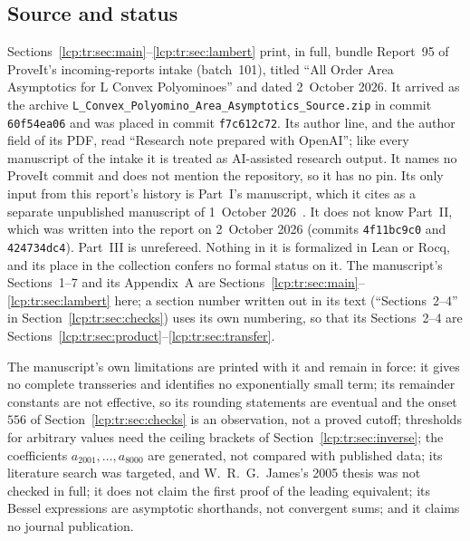 \documentclass[11pt]{article}
\numberwithin{equation}{section}
\theoremstyle{definition}\newtheorem{definition}[theorem]{Definition}
\theoremstyle{remark}\newtheorem{remark}[theorem]{Remark}
\begin{document}
\subsection{Source and status}\label{lcp:tr:sec:source}
Sections~\ref{lcp:tr:sec:main}--\ref{lcp:tr:sec:lambert} print, in full,
bundle Report~95 of ProveIt's incoming-reports intake (batch~101), titled
``All Order Area Asymptotics for L Convex Polyominoes'' and dated
2~October 2026. It arrived as the archive
\texttt{L\_\allowbreak Convex\_\allowbreak Polyomino\_\allowbreak Area\_\allowbreak Asymptotics\_\allowbreak Source.zip}
in commit \texttt{60f54ea06} and was placed in commit \texttt{f7c612c72}.
Its author line, and the author field of its PDF, read ``Research note
prepared with OpenAI''; like every manuscript of the intake it is treated
as AI-assisted research output. It names no ProveIt commit and does not
mention the repository, so it has no pin. Its only input from this
report's history is Part~I's manuscript, which it cites as a separate
unpublished manuscript of 1~October 2026~\cite{lcp-tr-earlier}. It does not
know Part~II, which was written into the report on 2~October 2026 (commits
\texttt{4f11bc9c0} and \texttt{424734dc4}). Part~III is unrefereed. Nothing
in it is formalized in Lean or Rocq, and its place in the collection
confers no formal status on it. The manuscript's Sections~1--7 and its
Appendix~A are Sections~\ref{lcp:tr:sec:main}--\ref{lcp:tr:sec:lambert}
here; a section number written out in its text (``Sections~2--4'' in
Section~\ref{lcp:tr:sec:checks}) uses its own numbering, so that its
Sections~2--4 are Sections~\ref{lcp:tr:sec:product}--\ref{lcp:tr:sec:transfer}.

The manuscript's own limitations are printed with it and remain in force:
it gives no complete transseries and identifies no exponentially small
term; its remainder constants are not effective, so its rounding
statements are eventual and the onset~$556$ of Section~\ref{lcp:tr:sec:checks}
is an observation, not a proved cutoff; thresholds for arbitrary values
need the ceiling brackets of Section~\ref{lcp:tr:sec:inverse}; the
coefficients $a_{2001},\ldots,a_{8000}$ are generated, not compared with
published data; its literature search was targeted, and W.~R.~G.~James's
2005 thesis was not checked in full; it does not claim the first proof of
the leading equivalent; its Bessel expressions are asymptotic shorthands,
not convergent sums; and it claims no journal publication.
\end{document}
